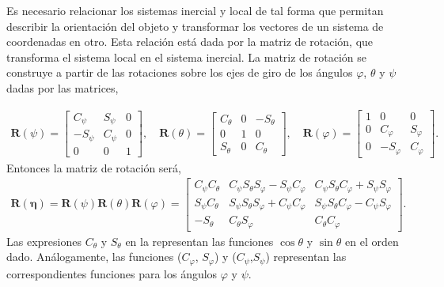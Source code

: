 Es necesario relacionar los sistemas inercial y local de tal forma que permitan describir la orientación del objeto y transformar los vectores de un sistema de coordenadas en otro. Esta relación está dada por la matriz de rotación, que transforma el sistema local en el sistema inercial. La matriz de rotación se construye a partir de las rotaciones sobre los ejes de giro de los ángulos $\varphi$, $\theta$ y $\psi$ dadas por las matrices,

\begin{align}
    \mathbf{R}(\psi) 
    =
    \begin{bmatrix}
        C_{\psi} & S_{\psi} & 0 \\
        -S_{\psi} & C_{\psi} & 0 \\
        0 & 0 & 1 
    \end{bmatrix}, \quad
    \mathbf{R}(\theta) 
    = 
    \begin{bmatrix}
        C_{\theta} & 0 & -S_{\theta} \\
        0 & 1 & 0 \\
        S_{\theta} & 0 & C_{\theta}
    \end{bmatrix}, \quad 
    \mathbf{R}(\varphi) 
    = 
    \begin{bmatrix}
        1 & 0 & 0 \\
        0 & C_{\varphi} & S_{\varphi} \\
        0 & -S_{\varphi} & C_{\varphi}
    \end{bmatrix}.
\end{align}
Entonces la matriz de rotación será,
\begin{align}
    \mathbf{R}(\bm{\eta}) = \mathbf{R}(\psi)\mathbf{R}(\theta)\mathbf{R}(\varphi) = 
    \begin{bmatrix}
        C_{\psi}C_{\theta} & C_{\psi}S_{\theta}S_{\varphi} - S_{\psi}C_{\varphi}& C_{\psi}S_{\theta}C_{\varphi} + S_{\psi}S_{\varphi} \\
        S_{\psi}C_{\theta} & S_{\psi}S_{\theta}S_{\varphi}+C_{\psi}C_{\varphi} & S_{\psi}S_{\theta}C_{\varphi}-C_{\psi}S_{\varphi} \\
        -S_{\theta} & C_{\theta}S_{\varphi}& C_{\theta}C_{\varphi}
        \label{eq:rotation_matrix}
    \end{bmatrix}.
\end{align}
Las expresiones $C_{\theta}$ y  $S_{\theta}$ en la  representan las funciones $\cos\theta$ y $\sin\theta$ en el orden dado. Análogamente, las funciones ($C_{\varphi}$, $S_{\varphi}$) y ($C_{\psi}$,$ S_{\psi}$) representan las correspondientes funciones para los ángulos $\varphi$ y $\psi$. \cite{capella2020clase}

